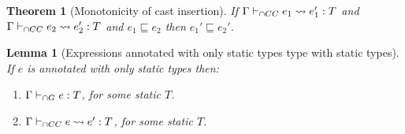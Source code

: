 \documentclass[a4paper]{article}
\newtheorem{theorem}{Theorem}
\newtheorem{lemma}{Lemma}
\begin{document}
\begin{theorem}[Monotonicity of cast insertion]
\label{monotonicity_cast_insertion}
If $\Gamma \vdash_{\cap CC} e_1 \leadsto e_1' : T$ and $\Gamma \vdash_{\cap CC} e_2 \leadsto e_2' : T$ and $e_1 \sqsubseteq e_2$ then $e_1' \sqsubseteq e_2'$.
\end{theorem}

\begin{lemma}[Expressions annotated with only static types type with static types]
\label{staticexpressionstypestatic}
If $e$ is annotated with only static types then:
\begin{enumerate}
    \item $\Gamma \vdash_{\cap G} e : T$, for some static $T$.
    \item $\Gamma \vdash_{\cap CC} e \leadsto e' : T$, for some static $T$.
\end{enumerate}
\end{lemma}
\end{document}
